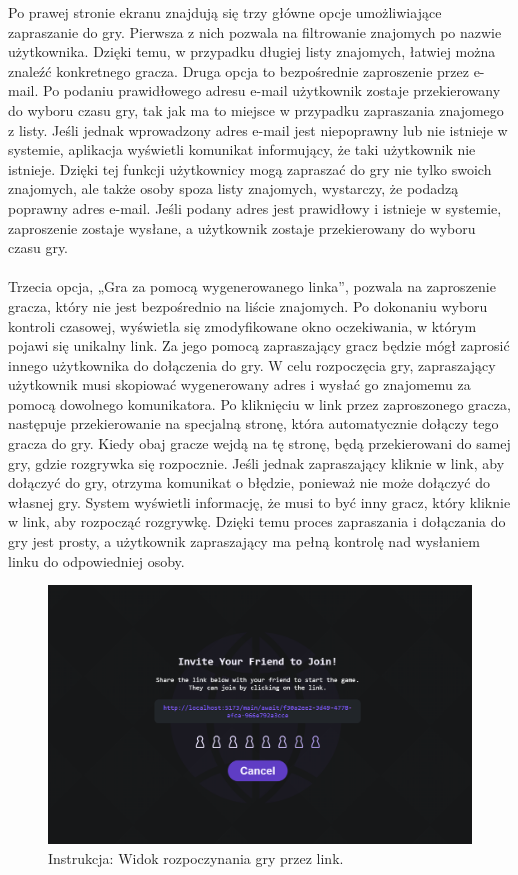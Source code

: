 \documentclass[12pt,a4paper]{article}
\begin{document}
\noindent
Po prawej stronie ekranu znajdują się trzy główne opcje umożliwiające zapraszanie do gry. Pierwsza z nich pozwala na filtrowanie znajomych po nazwie użytkownika. Dzięki temu, w przypadku długiej listy znajomych, łatwiej można znaleźć konkretnego gracza. Druga opcja to bezpośrednie zaproszenie przez e-mail. Po podaniu prawidłowego adresu e-mail użytkownik zostaje przekierowany do wyboru czasu gry, tak jak ma to miejsce w przypadku zapraszania znajomego z listy. Jeśli jednak wprowadzony adres e-mail jest niepoprawny lub nie istnieje w systemie, aplikacja wyświetli komunikat informujący, że taki użytkownik nie istnieje. Dzięki tej funkcji użytkownicy mogą zapraszać do gry nie tylko swoich znajomych, ale także osoby spoza listy znajomych, wystarczy, że podadzą poprawny adres e-mail. Jeśli podany adres jest prawidłowy i istnieje w systemie, zaproszenie zostaje wysłane, a użytkownik zostaje przekierowany do wyboru czasu gry.
\\\\
Trzecia opcja, „Gra za pomocą wygenerowanego linka”, pozwala na zaproszenie gracza, który nie jest bezpośrednio na liście znajomych. Po dokonaniu wyboru kontroli czasowej, wyświetla się zmodyfikowane okno oczekiwania, w którym pojawi się unikalny link. Za jego pomocą zapraszający gracz będzie mógł zaprosić innego użytkownika do dołączenia do gry. W celu rozpoczęcia gry, zapraszający użytkownik musi skopiować wygenerowany adres i wysłać go znajomemu za pomocą dowolnego komunikatora. Po kliknięciu w link przez zaproszonego gracza, następuje przekierowanie na specjalną stronę, która automatycznie dołączy tego gracza do gry. Kiedy obaj gracze wejdą na tę stronę, będą przekierowani do samej gry, gdzie rozgrywka się rozpocznie. Jeśli jednak zapraszający kliknie w link, aby dołączyć do gry, otrzyma komunikat o błędzie, ponieważ nie może dołączyć do własnej gry. System wyświetli informację, że musi to być inny gracz, który kliknie w link, aby rozpocząć rozgrywkę. Dzięki temu proces zapraszania i dołączania do gry jest prosty, a użytkownik zapraszający ma pełną kontrolę nad wysłaniem linku do odpowiedniej osoby.

\vspace{0.5cm}
\begin{figure}[h!]
    \centering
    \includegraphics[width=1\textwidth]{images/ins_min_link.png}
    \caption{Instrukcja: Widok rozpoczynania gry przez link.}
\end{figure}
\end{document}
